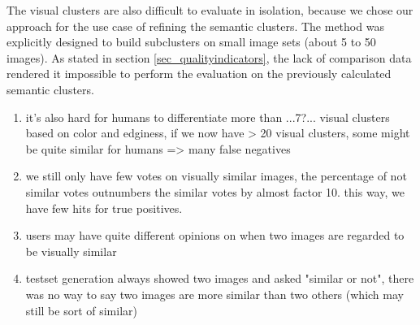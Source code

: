 The visual clusters are also difficult to evaluate in isolation, because we chose our approach for the use case of refining the semantic clusters. The method was explicitly designed to build subclusters on small image sets (about 5 to 50 images). As stated in section \ref{sec_qualityindicators}, the lack of comparison data rendered it impossible to perform the evaluation on the previously calculated semantic clusters.
\begin{enumerate}
\item it's also hard for humans to differentiate more than ...7?... visual clusters based on color and edginess, if we now have > 20 visual clusters, some might be quite similar for humans => many false negatives
\item we still only have few votes on visually similar images, the percentage of not similar votes outnumbers the similar votes by almost factor 10. this way, we have few hits for true positives.
\item users may have quite different opinions on when two images are regarded to be visually similar
\item testset generation always showed two images and asked "similar or not", there was no way to say two images are more similar than two others (which may still be sort of similar)
\end{enumerate}
